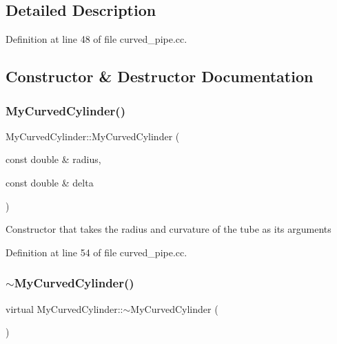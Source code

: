 \subsection{Detailed Description}


Definition at line 48 of file curved\+\_\+pipe.\+cc.



\subsection{Constructor \& Destructor Documentation}
\mbox{\label{classMyCurvedCylinder_a2af55228ec569d864957af4ab7d63d2b}} 
\subsubsection{\texorpdfstring{My\+Curved\+Cylinder()}{MyCurvedCylinder()}}
{\footnotesize\ttfamily My\+Curved\+Cylinder\+::\+My\+Curved\+Cylinder (\begin{DoxyParamCaption}\item[{const double \&}]{radius,  }\item[{const double \&}]{delta }\end{DoxyParamCaption})\hspace{0.3cm}{\ttfamily [inline]}}

Constructor that takes the radius and curvature of the tube as its arguments 

Definition at line 54 of file curved\+\_\+pipe.\+cc.

\mbox{\label{classMyCurvedCylinder_af474ed1dc8e4a1d433d4f1e77712b0a3}} 
\subsubsection{\texorpdfstring{$\sim$\+My\+Curved\+Cylinder()}{~MyCurvedCylinder()}}
{\footnotesize\ttfamily virtual My\+Curved\+Cylinder\+::$\sim$\+My\+Curved\+Cylinder (\begin{DoxyParamCaption}{ }\end{DoxyParamCaption})\hspace{0.3cm}{\ttfamily [inline]}}



